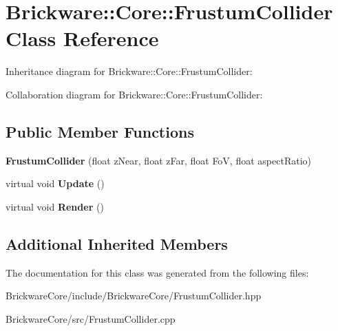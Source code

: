 \hypertarget{classBrickware_1_1Core_1_1FrustumCollider}{}\section{Brickware\+:\+:Core\+:\+:Frustum\+Collider Class Reference}
\label{classBrickware_1_1Core_1_1FrustumCollider}


Inheritance diagram for Brickware\+:\+:Core\+:\+:Frustum\+Collider\+:


Collaboration diagram for Brickware\+:\+:Core\+:\+:Frustum\+Collider\+:
\subsection*{Public Member Functions}
\begin{DoxyCompactItemize}
\item 
\hypertarget{classBrickware_1_1Core_1_1FrustumCollider_af310372148ad6dc891706a426a8decca}{}{\bfseries Frustum\+Collider} (float z\+Near, float z\+Far, float Fo\+V, float aspect\+Ratio)\label{classBrickware_1_1Core_1_1FrustumCollider_af310372148ad6dc891706a426a8decca}

\item 
\hypertarget{classBrickware_1_1Core_1_1FrustumCollider_accd3c563e51f61f0d2853f465e7cc66a}{}virtual void {\bfseries Update} ()\label{classBrickware_1_1Core_1_1FrustumCollider_accd3c563e51f61f0d2853f465e7cc66a}

\item 
\hypertarget{classBrickware_1_1Core_1_1FrustumCollider_aa1305205b0d9357e4c60d6c6c2fb2893}{}virtual void {\bfseries Render} ()\label{classBrickware_1_1Core_1_1FrustumCollider_aa1305205b0d9357e4c60d6c6c2fb2893}

\end{DoxyCompactItemize}
\subsection*{Additional Inherited Members}


The documentation for this class was generated from the following files\+:\begin{DoxyCompactItemize}
\item 
Brickware\+Core/include/\+Brickware\+Core/Frustum\+Collider.\+hpp\item 
Brickware\+Core/src/Frustum\+Collider.\+cpp\end{DoxyCompactItemize}
